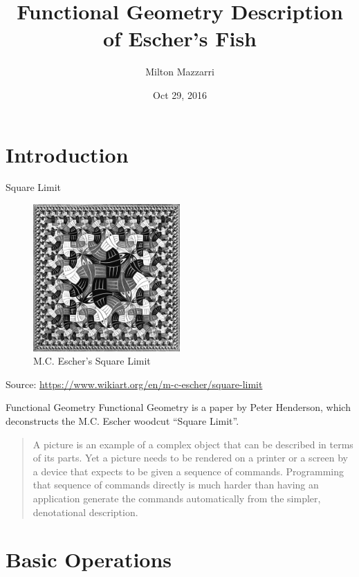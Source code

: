 \documentclass{beamer}
\title{Functional Geometry Description of Escher's Fish}
\date{Oct 29, 2016}
\author{Milton Mazzarri}
\institute{Mexico City Erlang Factory 2016}
\begin{document}
    \maketitle

    \section{Introduction}

    \begin{frame}{Square Limit}

        \begin{figure}
           \centering
            \includegraphics[width=0.5\textwidth]{./figs/square-limit}
            \caption{M.C. Escher's Square Limit}
            \label{fig:square_limit}
        \end{figure}
        {\footnotesize Source: \url{https://www.wikiart.org/en/m-c-escher/square-limit}}
    \end{frame}

    \begin{frame}{Functional Geometry}
        Functional Geometry is a paper by Peter Henderson\cite{Henderson82,Henderson02}, which deconstructs the M.C. Escher woodcut ``Square Limit''.
        \begin{quote}
            A picture is an example of a complex object that can be described
            in terms of its parts. Yet a picture needs to be rendered on a
            printer or a screen by a device that expects to be given a sequence
            of commands. Programming that sequence of commands directly is much
            harder than having an application generate the commands
            automatically from the simpler, denotational description.
        \end{quote}
    \end{frame}

    \section{Basic Operations}
\end{document}
